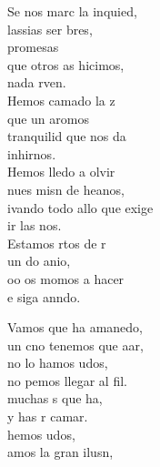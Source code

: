 \begin{cancion}%
	Se nos marc la inquied, \\
	lassias  ser bres,\\
	promesas\\
	que otros as hicimos,\\
	 nada rven.\\
	Hemos camado la z\\
	que un aromos\\
	  tranquilid que nos da\\
	 inhirnos.\\
	\jump
	Hemos lledo a olvir\\
	nues misn de heanos, \\
	ivando todo allo que exige\\
	ir las nos.\\
	Estamos rtos de r\\
	un do anio,\\
	oo os momos a hacer\\
	e siga anndo.\jump\\
	\begin{chorus}%
		Vamos que  ha amanedo,\\
		un cno tenemos que aar,\\
		no lo hamos udos,\\
		no pemos llegar al fil.\\
		 muchas s que ha,\\
		y has r camar.\\
		hemos udos,\\
		amos la gran ilusn, \\

\end{chorus}
\end{cancion}

